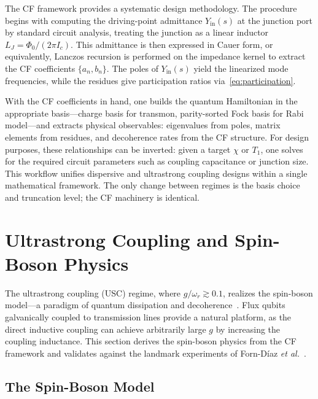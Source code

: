 \documentclass[reprint, floatfix, superscriptaddress, amsmath, amssymb, longbibliography]{revtex4-2}
\begin{document}
The CF framework provides a systematic design methodology. The procedure begins with computing the driving-point admittance $Y_{\mathrm{in}}(s)$ at the junction port by standard circuit analysis, treating the junction as a linear inductor $L_J = \Phi_0/(2\pi I_c)$. This admittance is then expressed in Cauer form, or equivalently, Lanczos recursion is performed on the impedance kernel to extract the CF coefficients $\{a_n, b_n\}$. The poles of $Y_{\mathrm{in}}(s)$ yield the linearized mode frequencies, while the residues give participation ratios via~\eqref{eq:participation}.

With the CF coefficients in hand, one builds the quantum Hamiltonian in the appropriate basis---charge basis for transmon, parity-sorted Fock basis for Rabi model---and extracts physical observables: eigenvalues from poles, matrix elements from residues, and decoherence rates from the CF structure. For design purposes, these relationships can be inverted: given a target $\chi$ or $T_1$, one solves for the required circuit parameters such as coupling capacitance or junction size. This workflow unifies dispersive and ultrastrong coupling designs within a single mathematical framework. The only change between regimes is the basis choice and truncation level; the CF machinery is identical.

\section{Ultrastrong Coupling and Spin-Boson Physics}
\label{sec:usc_spinboson}

The ultrastrong coupling (USC) regime, where $g/\omega_r \gtrsim 0.1$, realizes the spin-boson model---a paradigm of quantum dissipation and decoherence~\cite{Leggett1987, Weiss2012}. Flux qubits galvanically coupled to transmission lines provide a natural platform, as the direct inductive coupling can achieve arbitrarily large $g$ by increasing the coupling inductance. This section derives the spin-boson physics from the CF framework and validates against the landmark experiments of Forn-D\'iaz \textit{et al.}~\cite{FornDiaz2017}.

\subsection{The Spin-Boson Model}
\label{sec:spin_boson}
\end{document}
